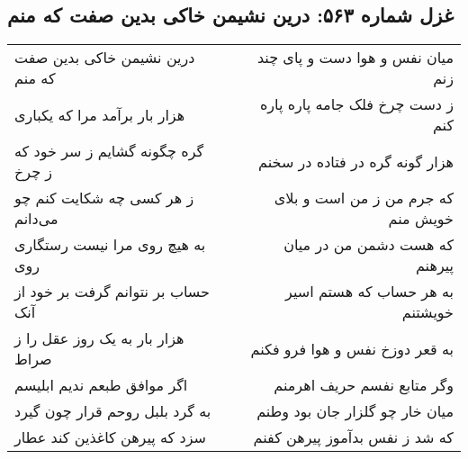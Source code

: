 \begin{center}
\section*{غزل شماره ۵۶۳: درین نشیمن خاکی بدین صفت که منم}
\label{sec:563}
\begin{longtable}{l p{0.5cm} r}
درین نشیمن خاکی بدین صفت که منم
&&
میان نفس و هوا دست و پای چند زنم
\\
هزار بار برآمد مرا که یکباری
&&
ز دست چرخ فلک جامه پاره پاره کنم
\\
گره چگونه گشایم ز سر خود که ز چرخ
&&
هزار گونه گره در فتاده در سخنم
\\
ز هر کسی چه شکایت کنم چو می‌دانم
&&
که جرم من ز من است و بلای خویش منم
\\
به هیچ روی مرا نیست رستگاری روی
&&
که هست دشمن من در میان پیرهنم
\\
حساب بر نتوانم گرفت بر خود از آنک
&&
به هر حساب که هستم اسیر خویشتنم
\\
هزار بار به یک روز عقل را ز صراط
&&
به قعر دوزخ نفس و هوا فرو فکنم
\\
اگر موافق طبعم ندیم ابلیسم
&&
وگر متابع نفسم حریف اهرمنم
\\
به گرد بلبل روحم قرار چون گیرد
&&
میان خار چو گلزار جان بود وطنم
\\
سزد که پیرهن کاغذین کند عطار
&&
که شد ز نفس بدآموز پیرهن کفنم
\\
\end{longtable}
\end{center}
